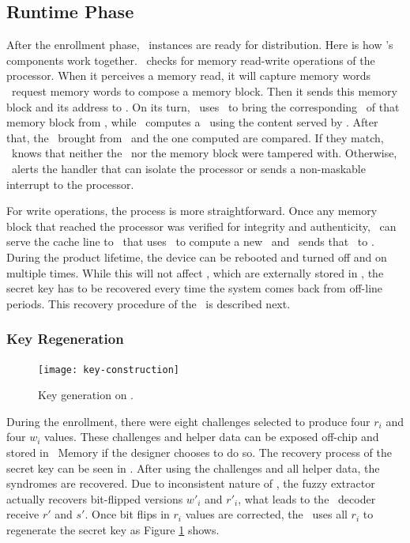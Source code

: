 \subsection{Runtime Phase}
\label{subsec:runtimephase}

After the enrollment phase, \cshia~instances are ready for distribution. Here is how \cshia's components work together. \handler~checks for memory read-write operations of the processor. When it perceives a memory read, it will capture memory words \andor~request memory words to compose a memory block. Then it sends this memory block and its address to \seceng. On its turn, \seceng~uses \pmmu~to bring the corresponding \ptag~of that memory block from \ptagmem, while \ptaggen~computes a \ptag~using the content served by \handler. After that, the \ptag~brought from \ptagmem~and the one computed are compared. If they match, \seceng~knows that neither the \ptag~nor the memory block were tampered with. Otherwise, \seceng~alerts the handler that can isolate the processor or sends a non-maskable interrupt to the processor.


For write operations, the process is more straightforward. Once any memory block that reached the processor was verified for integrity and authenticity, \handler~can serve the cache line to \seceng~that uses \ptaggen~to compute a new \ptag~and \pmmu~sends that \ptag~to \ptagmem.  During the product lifetime, the device can be rebooted and turned off and on multiple times. While this will not affect \ptags, which are externally stored in \ptagmem, the secret key has to be recovered every time the system comes back from off-line periods. This recovery procedure of the \fuzzy~is described next.

\subsubsection{Key Regeneration}
\label{subsubsec:Key-Regenation}
\begin{figure}[!t]
    \centering
    \texttt{[image: key-construction]}
    \caption{Key generation on \cshia.}
    \label{fig:key-construction}
\end{figure}

During the enrollment, there were eight challenges selected to produce four $r_i$ and four $w_i$ values. These challenges and helper data can be exposed off-chip and stored in \ptag~Memory if the designer chooses to do so. The recovery process of the secret key can be seen in \fregen. After using the challenges and all helper data, the syndromes are recovered. Due to inconsistent nature of \pufs, the fuzzy extractor actually recovers bit-flipped versions $w'_i$ and $r'_i$, what leads to the \bch~decoder receive $r'$ and $s'$. Once bit flips in $r_i$ values are corrected, the \fe~uses all $r_i$ to regenerate the secret key as Figure \ref{fig:key-construction} shows.


